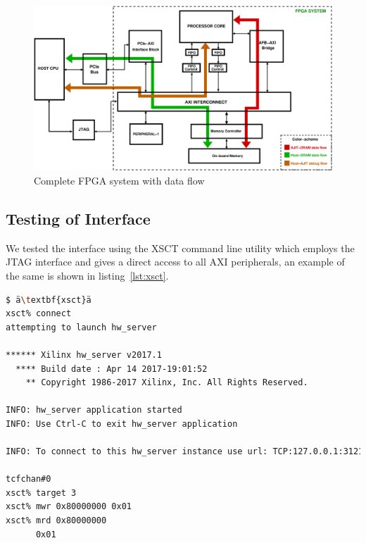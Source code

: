 \begin{figure}[H]
\centering
\includegraphics[width=\textwidth]{eps_pdf_sources/ajit_fpga/Full_System/Full_system_with_flow}
\caption{Complete FPGA system with data flow}
\label{full system with flow}
\end{figure}

\subsection{Testing of Interface}

We tested the interface using the XSCT command line utility which employs the JTAG interface and gives a direct access to all AXI
peripherals, an example of the same is shown in listing~\ref{lst:xsct}. 

\singlespacing
\scriptsize{
\begin{lstlisting}[language=bash, caption=xsct in action, label={lst:xsct}, emph={xsct, mrd, mwr}]
$ ä\textbf{xsct}ä
xsct% connect                                                                                                                                                             
attempting to launch hw_server
                                                                                                                                                                          
****** Xilinx hw_server v2017.1
  **** Build date : Apr 14 2017-19:01:52
    ** Copyright 1986-2017 Xilinx, Inc. All Rights Reserved.

INFO: hw_server application started
INFO: Use Ctrl-C to exit hw_server application

INFO: To connect to this hw_server instance use url: TCP:127.0.0.1:3121

tcfchan#0
xsct% target 3
xsct% mwr 0x80000000 0x01 
xsct% mrd 0x80000000
      0x01
\end{lstlisting}
}

